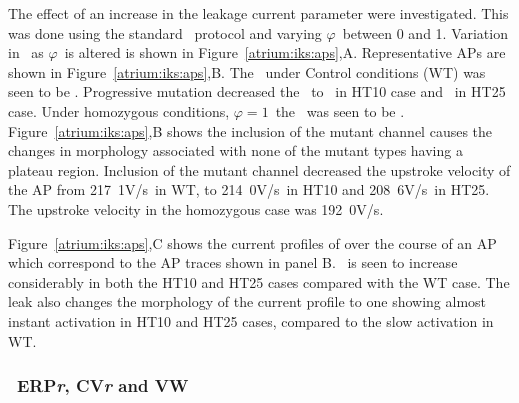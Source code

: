 The effect of an increase in the leakage current parameter were investigated.
This was done using the standard \apd\ protocol and varying $\varphi$\ between
0 and 1.
Variation in \apd\ as $\varphi$\ is altered is shown in
Figure~\ref{atrium:iks:aps},A.
Representative APs are shown in Figure~\ref{atrium:iks:aps},B.
The \apd\ under Control conditions (WT) was seen to be .
Progressive mutation decreased the \apd\ to \ in HT10 case and
\ in HT25 case.
Under homozygous conditions, $\varphi = 1$\, the \apd\ was seen to be .
Figure~\ref{atrium:iks:aps},B shows the inclusion of the mutant channel causes
the changes in morphology associated with none of the mutant types having a
plateau region.
Inclusion of the mutant channel decreased the upstroke velocity of the AP from
\unit{217.1}{V/s}\ in WT, to \unit{214.0}{V/s}\ in HT10 and \unit{208.6}{V/s}\
in HT25.
The upstroke velocity in the homozygous case was \unit{192.0}{V/s}.

Figure~\ref{atrium:iks:aps},C shows the current profiles of  over the course of
an AP which correspond to the AP traces shown in panel B.
\ii{Ks}\ is seen to increase considerably in both the HT10 and HT25 cases
compared with the WT case.
The leak also changes the morphology of the current profile to one showing
almost instant activation in HT10 and HT25 cases, compared to the slow
activation in WT.

\subsubsection{\apdr\, ERP\emph{r}, CV\emph{r} and VW}

